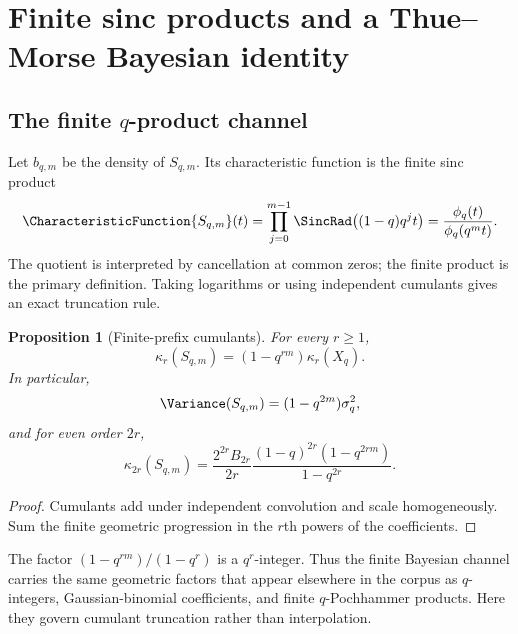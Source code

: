 \documentclass[11pt,oneside]{article}
\newtheorem{proposition}[theorem]{Proposition}
\theoremstyle{definition}
\theoremstyle{remark}
\begin{document}
\section{Finite sinc products and a Thue--Morse Bayesian identity}
\label{sec:TM-channel}

\subsection{The finite $q$-product channel}

Let $b_{q,m}$ be the density of $S_{q,m}$.  Its characteristic function is the
finite sinc product
\begin{equation}
 \CharacteristicFunction{S_{q,m}}(t)
 =\prod_{j=0}^{m-1}\SincRad\bigl((1-q)q^jt\bigr)
 =\frac{\phi_q(t)}{\phi_q(q^mt)}.
 \label{eq:finite-sinc}
\end{equation}
The quotient is interpreted by cancellation at common zeros; the finite product
is the primary definition.  Taking logarithms or using independent cumulants gives
an exact truncation rule.

\begin{proposition}[Finite-prefix cumulants]
\label{prop:prefix-cumulants}
For every $r\ge1$,
\begin{equation}
 \kappa_r(S_{q,m})=(1-q^{rm})\kappa_r(X_q).
 \label{eq:prefix-cumulants}
\end{equation}
In particular,
\begin{equation}
 \Variance(S_{q,m})=(1-q^{2m})\sigma_q^2,
 \label{eq:prefix-var}
\end{equation}
and for even order $2r$,
\begin{equation}
 \kappa_{2r}(S_{q,m})
 =\frac{2^{2r}B_{2r}}{2r}
   \frac{(1-q)^{2r}(1-q^{2rm})}{1-q^{2r}}.
 \label{eq:prefix-Bernoulli}
\end{equation}
\end{proposition}

\begin{proof}
Cumulants add under independent convolution and scale homogeneously.  Sum the
finite geometric progression in the $r$th powers of the coefficients.
\end{proof}

The factor $(1-q^{rm})/(1-q^r)$ is a $q^r$-integer.  Thus the finite Bayesian
channel carries the same geometric factors that appear elsewhere in the corpus as
$q$-integers, Gaussian-binomial coefficients, and finite $q$-Pochhammer products.
Here they govern cumulant truncation rather than interpolation.
\end{document}
